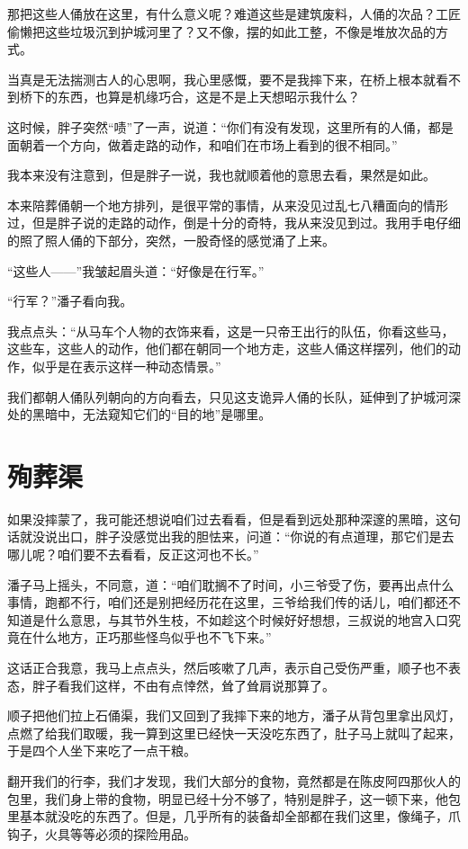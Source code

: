 那把这些人俑放在这里，有什么意义呢？难道这些是建筑废料，人俑的次品？工匠偷懒把这些垃圾沉到护城河里了？又不像，摆的如此工整，不像是堆放次品的方式。

当真是无法揣测古人的心思啊，我心里感慨，要不是我摔下来，在桥上根本就看不到桥下的东西，也算是机缘巧合，这是不是上天想昭示我什么？

这时候，胖子突然“啧”了一声，说道：“你们有没有发现，这里所有的人俑，都是面朝着一个方向，做着走路的动作，和咱们在市场上看到的很不相同。”

我本来没有注意到，但是胖子一说，我也就顺着他的意思去看，果然是如此。

本来陪葬俑朝一个地方排列，是很平常的事情，从来没见过乱七八糟面向的情形过，但是胖子说的走路的动作，倒是十分的奇特，我从来没见到过。我用手电仔细的照了照人俑的下部分，突然，一股奇怪的感觉涌了上来。

“这些人——”我皱起眉头道：“好像是在行军。”

“行军？”潘子看向我。

我点点头：“从马车个人物的衣饰来看，这是一只帝王出行的队伍，你看这些马，这些车，这些人的动作，他们都在朝同一个地方走，这些人俑这样摆列，他们的动作，似乎是在表示这样一种动态情景。”

我们都朝人俑队列朝向的方向看去，只见这支诡异人俑的长队，延伸到了护城河深处的黑暗中，无法窥知它们的“目的地”是哪里。

\chapter{殉葬渠}

如果没摔蒙了，我可能还想说咱们过去看看，但是看到远处那种深邃的黑暗，这句话就没说出口，胖子没感觉出我的胆怯来，问道：“你说的有点道理，那它们是去哪儿呢？咱们要不去看看，反正这河也不长。”

潘子马上摇头，不同意，道：“咱们耽搁不了时间，小三爷受了伤，要再出点什么事情，跑都不行，咱们还是别把经历花在这里，三爷给我们传的话儿，咱们都还不知道是什么意思，与其节外生枝，不如趁这个时候好好想想，三叔说的地宫入口究竟在什么地方，正巧那些怪鸟似乎也不飞下来。”

这话正合我意，我马上点点头，然后咳嗽了几声，表示自己受伤严重，顺子也不表态，胖子看我们这样，不由有点悻然，耸了耸肩说那算了。

顺子把他们拉上石俑渠，我们又回到了我摔下来的地方，潘子从背包里拿出风灯，点燃了给我们取暖，我一算到这里已经快一天没吃东西了，肚子马上就叫了起来，于是四个人坐下来吃了一点干粮。

翻开我们的行李，我们才发现，我们大部分的食物，竟然都是在陈皮阿四那伙人的包里，我们身上带的食物，明显已经十分不够了，特别是胖子，这一顿下来，他包里基本就没吃的东西了。但是，几乎所有的装备却全部都在我们这里，像绳子，爪钩子，火具等等必须的探险用品。

